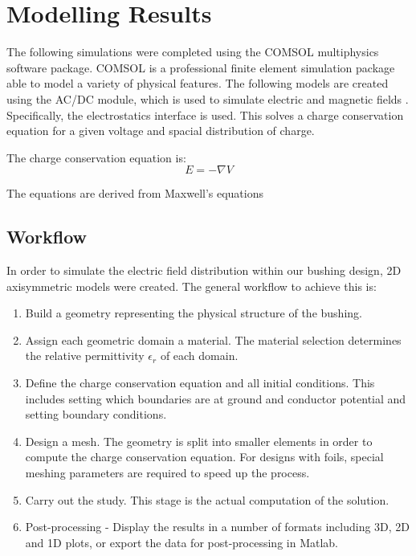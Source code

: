 
\section{Modelling Results}
The following simulations were completed using the COMSOL multiphysics software package.
COMSOL is a professional finite element simulation package able to model a variety of physical features.
The following models are created using the AC/DC module, which is used to simulate electric and magnetic fields \cite{ACDCCOMSOLMODULE}.
Specifically, the electrostatics interface is used. 
This solves a charge conservation equation for a given voltage and spacial distribution of charge.

The charge conservation equation is:
\begin{equation}
E = -\nabla V
\end{equation}

The equations are derived from Maxwell's equations 

\subsection{Workflow}
In order to simulate the electric field distribution within our bushing design, 2D axisymmetric models were created. The general workflow to achieve this is:
\begin{enumerate}
\item Build a geometry representing the physical structure of the bushing.
\item Assign each geometric domain a material. The material selection determines the relative permittivity $\epsilon_r$ of each domain.
\item Define the charge conservation equation and all initial conditions. This includes setting which boundaries are at ground and conductor potential and setting boundary conditions.
\item Design a mesh. The geometry is split into smaller elements in order to compute the charge conservation equation. For designs with foils, special meshing parameters are required to speed up the process.
\item Carry out the study. This stage is the actual computation of the solution.
\item Post-processing - Display the results in a number of formats including 3D, 2D and 1D plots, or export the data for post-processing in Matlab.
\end{enumerate}


